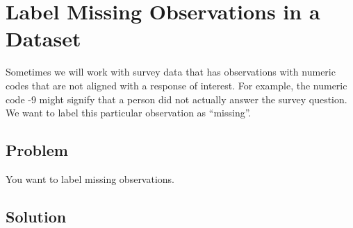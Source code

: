 \documentclass[
]{book}
\begin{document}
\hypertarget{missing}{%
\section{Label Missing Observations in a Dataset}\label{missing}}

Sometimes we will work with survey data that has observations with numeric codes that are not aligned with a response of interest. For example, the numeric code -9 might signify that a person did not actually answer the survey question. We want to label this particular observation as ``missing''.

\hypertarget{problem-18}{%
\subsection{Problem}\label{problem-18}}

You want to label missing observations.

\hypertarget{solution-17}{%
\subsection{Solution}\label{solution-17}}

  
\end{document}
